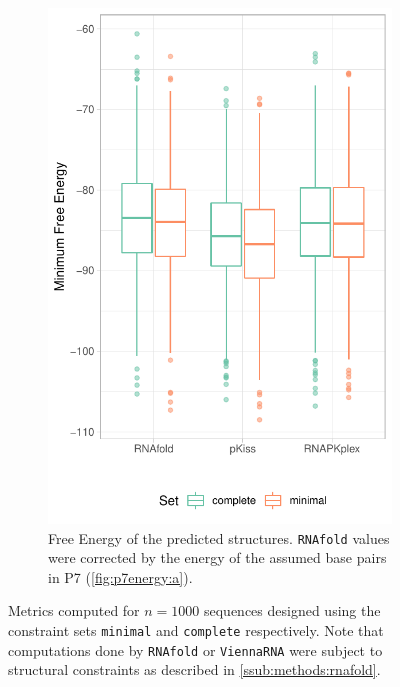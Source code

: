 \documentclass[../../master.tex]{subfiles}
\begin{document}
\begin{figure}[!ht]
\begin{subfigure}[t]{0.27\textwidth}
		\includegraphics[width=\textwidth]{pic/results/designs/boxplots/const-mfe-boxplot.pdf}
		\caption{Free Energy of the predicted structures.  \texttt{RNAfold} values were corrected by the energy of the assumed base pairs in P7 (\autoref{fig:p7energy:a}).
		}\label{fig:stats_constrained:d}
	\end{subfigure}
	\caption[Properties of Sequence Designs (Constrained Approach)]{
		Metrics computed for $n = 1000$ sequences designed using the constraint sets \texttt{minimal} and \texttt{complete} respectively. Note that computations done by \texttt{RNAfold} or \texttt{ViennaRNA} were subject to structural constraints as described in \autoref{ssub:methods:rnafold}.
	}\label{fig:stats_constrained}
\end{figure}
\end{document}

